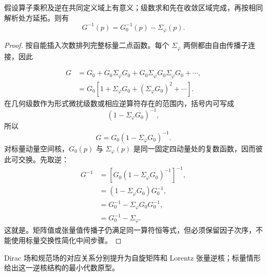 \begin{proposition}[自能插入的预解式重求和]
假设算子乘积及逆在共同定义域上有意义；级数求和先在收敛区域完成，再按相同解析处方延拓。则有
\begin{equation}
 {G^{-1}(p)=G_0^{-1}(p)-\Sigma_\varphi(p).}
\label{eq:exact-dyson-scalar-SI-r15}
\end{equation}
\end{proposition}
\begin{proof}
按自能插入次数排列完整标量二点函数。每个 $\Sigma_\varphi$ 两侧都由自由传播子连接，因此

\begin{align*}
 G
 &=G_0+G_0\Sigma_\varphi G_0
 +G_0\Sigma_\varphi G_0\Sigma_\varphi G_0+\cdots,\\
 &=G_0\left[
 1+\Sigma_\varphi G_0+(\Sigma_\varphi G_0)^2+\cdots
 \right].
\end{align*}
在几何级数作为形式微扰级数或相应逆算符存在的范围内，括号内可写成
\begin{equation*}
 \left(1-\Sigma_\varphi G_0\right)^{-1},
\end{equation*}
所以
\begin{equation*}
 G=G_0(1-\Sigma_\varphi G_0)^{-1}.
\end{equation*}
对标量动量空间核，$G_0(p)$ 与 $\Sigma_\varphi(p)$ 是同一固定四动量处的复数函数，因而彼此可交换。先取逆：
\begin{align*}
 G^{-1}
 &=\left[G_0(1-\Sigma_\varphi G_0)^{-1}\right]^{-1},\\
 &=(1-\Sigma_\varphi G_0)G_0^{-1},\\
 &=G_0^{-1}-\Sigma_\varphi G_0G_0^{-1},\\
 &=G_0^{-1}-\Sigma_\varphi.
\end{align*}
这就是。矩阵值或张量值传播子仍满足同一算符恒等式，但必须保留因子次序，不能使用标量交换性简化中间步骤。
\end{proof}

Dirac 场和规范场的对应关系分别提升为自旋矩阵和 Lorentz 张量逆核；标量情形给出这一逆核结构的最小代数原型。

